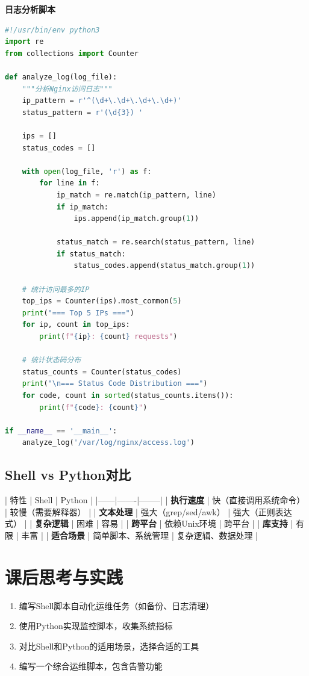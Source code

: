 \documentclass[12pt,UTF8]{ctexbook}
\begin{document}
\textbf{日志分析脚本}
\begin{lstlisting}[language=python]
#!/usr/bin/env python3
import re
from collections import Counter

def analyze_log(log_file):
    """分析Nginx访问日志"""
    ip_pattern = r'^(\d+\.\d+\.\d+\.\d+)'
    status_pattern = r'(\d{3}) '
    
    ips = []
    status_codes = []
    
    with open(log_file, 'r') as f:
        for line in f:
            ip_match = re.match(ip_pattern, line)
            if ip_match:
                ips.append(ip_match.group(1))
            
            status_match = re.search(status_pattern, line)
            if status_match:
                status_codes.append(status_match.group(1))
    
    # 统计访问最多的IP
    top_ips = Counter(ips).most_common(5)
    print("=== Top 5 IPs ===")
    for ip, count in top_ips:
        print(f"{ip}: {count} requests")
    
    # 统计状态码分布
    status_counts = Counter(status_codes)
    print("\n=== Status Code Distribution ===")
    for code, count in sorted(status_counts.items()):
        print(f"{code}: {count}")

if __name__ == '__main__':
    analyze_log('/var/log/nginx/access.log')
\end{lstlisting}

\subsection*{Shell vs Python对比}

| 特性 | Shell | Python |
|------|-------|--------|
| \textbf{执行速度} | 快（直接调用系统命令） | 较慢（需要解释器） |
| \textbf{文本处理} | 强大（grep/sed/awk） | 强大（正则表达式） |
| \textbf{复杂逻辑} | 困难 | 容易 |
| \textbf{跨平台} | 依赖Unix环境 | 跨平台 |
| \textbf{库支持} | 有限 | 丰富 |
| \textbf{适合场景} | 简单脚本、系统管理 | 复杂逻辑、数据处理 |

\section{课后思考与实践}
\label{sec:scripting-practice}
\begin{enumerate}
    \item 编写Shell脚本自动化运维任务（如备份、日志清理）
    \item 使用Python实现监控脚本，收集系统指标
    \item 对比Shell和Python的适用场景，选择合适的工具
    \item 编写一个综合运维脚本，包含告警功能
\end{enumerate}
\end{document}
